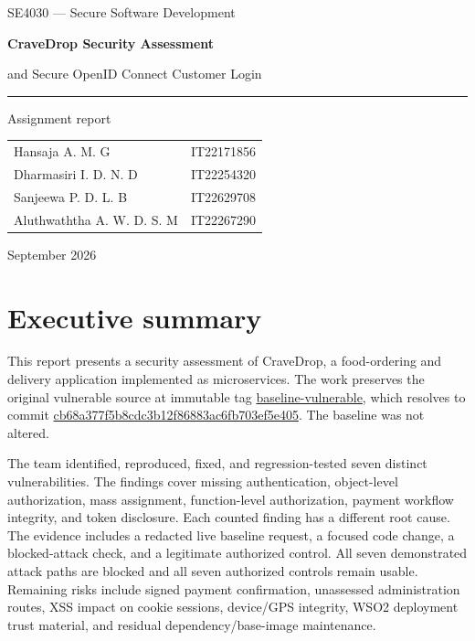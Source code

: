 \documentclass[11pt]{article}
\newcommand{\evidence}[1]{{\small\url{#1}}}
\begin{document}
\begin{titlepage}
\centering
\vspace*{1.3in}
{\Large SE4030 --- Secure Software Development\par}
\vspace{0.25in}
{\Huge\bfseries CraveDrop Security Assessment\par}
\vspace{0.12in}
{\Large and Secure OpenID Connect Customer Login\par}
\vspace{0.5in}
\rule{0.8\textwidth}{0.6pt}\par
\vspace{0.35in}
{\large Assignment report\par}
\vfill
\begin{tabular}{ll}
Hansaja A. M. G & IT22171856 \\
Dharmasiri I. D. N. D & IT22254320 \\
Sanjeewa P. D. L. B & IT22629708 \\
Aluthwaththa A. W. D. S. M & IT22267290 \\
\end{tabular}
\vfill
{\large September 2026\par}
\end{titlepage}

\tableofcontents
\clearpage
{}

\section{Executive summary}
This report presents a security assessment of CraveDrop, a food-ordering and delivery application implemented as microservices. The work preserves the original vulnerable source at immutable tag \evidence{baseline-vulnerable}, which resolves to commit \evidence{cb68a377f5b8cdc3b12f86883ac6fb703ef5e405}. The baseline was not altered.

The team identified, reproduced, fixed, and regression-tested seven distinct vulnerabilities. The findings cover missing authentication, object-level authorization, mass assignment, function-level authorization, payment workflow integrity, and token disclosure. Each counted finding has a different root cause. The evidence includes a redacted live baseline request, a focused code change, a blocked-attack check, and a legitimate authorized control. All seven demonstrated attack paths are blocked and all seven authorized controls remain usable. Remaining risks include signed payment confirmation, unassessed administration routes, XSS impact on cookie sessions, device/GPS integrity, WSO2 deployment trust material, and residual dependency/base-image maintenance.
\end{document}
